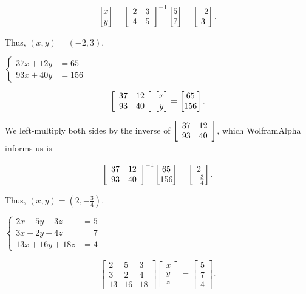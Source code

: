 \documentclass[../key.tex]{subfiles}
\begin{document}
$$\begin{bmatrix} x \\ y \end{bmatrix} = \left[\begin{array}{cc} 2 & 3 \\ 4 & 5 \end{array}\right]^{-1}\begin{bmatrix} 5 \\ 7 \end{bmatrix} = \begin{bmatrix} -2 \\ 3 \end{bmatrix}.$$

Thus, $(x,y) = (-2,3)$.

\begin{inner_problem}
\item $\begin{cases} 37x+12y &= 65 \\ 93x+40y &= 156\end{cases}$
\end{inner_problem}

$$\left[\begin{array}{cc} 37 & 12 \\ 93 & 40 \end{array}\right]\begin{bmatrix} x \\ y \end{bmatrix} = \begin{bmatrix} 65 \\ 156 \end{bmatrix}.$$

We left-multiply both sides by the inverse of $\left[\begin{array}{cc} 37 & 12 \\ 93 & 40 \end{array}\right]$, which WolframAlpha informs us is

$$\left[\begin{array}{cc} 37 & 12 \\ 93 & 40 \end{array}\right]^{-1} \begin{bmatrix} 65 \\ 156 \end{bmatrix}=\begin{bmatrix} 2 \\ -\frac{3}{4} \end{bmatrix}.$$

Thus, $(x,y) = \left(2, -\frac{3}{4} \right)$.

\begin{inner_problem}
\item $\begin{cases} 2x+5y+3z &= 5 \\ 3x+2y+4z &= 7 \\ 13x+16y+18z &= 4\end{cases}$
\end{inner_problem}

$$\begin{bmatrix} 2 & 5 & 3 \\ 3 & 2 & 4 \\ 13 & 16 & 18 \end{bmatrix}\begin{bmatrix} x \\ y \\ z \end{bmatrix} = \begin{bmatrix} 5 \\ 7 \\ 4 \end{bmatrix}.$$
\end{document}
